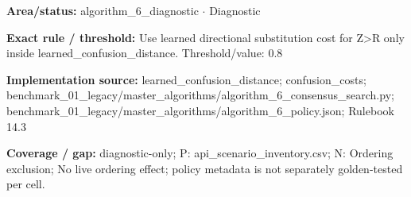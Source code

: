 \begin{tcolorbox}[enhanced,breakable,colback=white,colframe=Muted!45,boxrule=0.45pt,arc=1.5pt,left=6pt,right=6pt,top=5pt,bottom=5pt,title={\texttt{A6-LEARNED-SUBSTITUTION-Z-R}},title after break={\texttt{A6-LEARNED-SUBSTITUTION-Z-R}\ (continued)},fonttitle=\headingfont\bfseries\color{Navy},coltitle=Navy]
\textbf{Area/status:} algorithm\_\allowbreak{}6\_\allowbreak{}diagnostic $\boldsymbol{\cdot}$ Diagnostic\par
\smallskip
\textbf{Exact rule / threshold:} Use learned directional substitution cost for Z>R only inside learned\_\allowbreak{}confusion\_\allowbreak{}distance. Threshold/\allowbreak{}value: 0.8\par
\smallskip
\textbf{Implementation source:} learned\_\allowbreak{}confusion\_\allowbreak{}distance; confusion\_\allowbreak{}costs; benchmark\_\allowbreak{}01\_\allowbreak{}legacy/\allowbreak{}master\_\allowbreak{}algorithms/\allowbreak{}algorithm\_\allowbreak{}6\_\allowbreak{}consensus\_\allowbreak{}search.py; benchmark\_\allowbreak{}01\_\allowbreak{}legacy/\allowbreak{}master\_\allowbreak{}algorithms/\allowbreak{}algorithm\_\allowbreak{}6\_\allowbreak{}policy.json; Rulebook 14.3\par
\smallskip
\textbf{Coverage / gap:} diagnostic-only; P: api\_\allowbreak{}scenario\_\allowbreak{}inventory.csv; N: Ordering exclusion; No live ordering effect; policy metadata is not separately golden-tested per cell.
\end{tcolorbox}
\medskip
